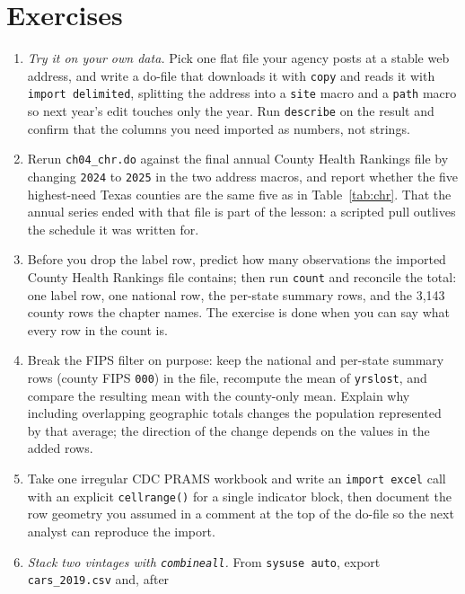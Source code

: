 \documentclass[
    a4paper,
    fontsize=10pt,
    twoside=true,
    numbers=noenddot,
]{kaobook}
\begin{document}
\section*{Exercises}
\begin{enumerate}
  \item \emph{Try it on your own data.} Pick one flat file your
    agency posts at a stable web address, and write a do-file that
    downloads it with \texttt{copy} and reads it with
    \texttt{import delimited}, splitting the address into a
    \texttt{site} macro and a \texttt{path} macro so next year's
    edit touches only the year. Run \texttt{describe} on the result
    and confirm that the columns you need imported as numbers, not
    strings.
  \item Rerun \texttt{ch04\_chr.do} against the final annual County
    Health Rankings file by changing \texttt{2024} to \texttt{2025}
    in the two address macros, and report whether the five
    highest-need Texas counties are the same five as in
    Table~\ref{tab:chr}. That the annual series ended with that
    file is part of the lesson: a scripted pull outlives the
    schedule it was written for.
  \item Before you drop the label row, predict how many observations
    the imported County Health Rankings file contains; then run
    \texttt{count} and reconcile the total: one label row, one
    national row, the per-state summary rows, and the 3{,}143 county
    rows the chapter names. The exercise is done when you can
    say what every row in the count is.
  \item Break the FIPS filter on purpose: keep the national and
    per-state summary rows (county FIPS \texttt{000}) in the file,
    recompute the mean of \texttt{yrslost}, and compare the resulting mean with the county-only mean. Explain why
    including overlapping geographic totals changes the population
    represented by that average; the direction of the change depends
    on the values in the added rows.
  \item Take one irregular CDC PRAMS workbook and write an
    \texttt{import excel} call with an explicit \texttt{cellrange()}
    for a single indicator block, then document the row geometry you
    assumed in a comment at the top of the do-file so the next
    analyst can reproduce the import.
  \item \emph{Stack two vintages with \texttt{combineall}.} From
    \texttt{sysuse auto}, export \texttt{cars\_2019.csv} and, after

\end{enumerate}
\end{document}

